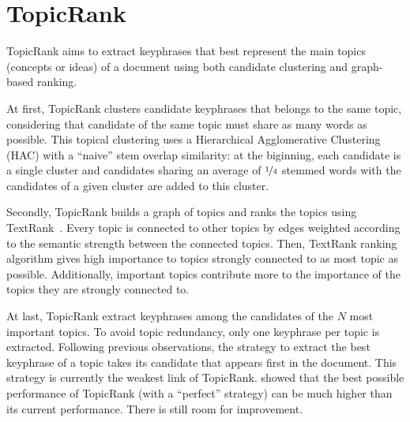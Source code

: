 \section{TopicRank}
\label{sec:topicrank}
  TopicRank aims to extract keyphrases that best represent the main topics
  (concepts or ideas) of a document using both candidate clustering and
  graph-based ranking.

  At first, TopicRank clusters candidate keyphrases that belongs to the same
  topic, considering that candidate of the same topic must share as many words
  as possible. This topical clustering uses a Hierarchical Agglomerative
  Clustering (HAC) with a ``naive'' stem overlap similarity: at the biginning,
  each candidate is a single cluster and candidates sharing an average of
  $\unitfrac{1}{4}$ stemmed words with the candidates of a given cluster are
  added to this cluster.

  Secondly, TopicRank builds a graph of topics and ranks the topics using
  TextRank~\cite{mihalcea2004textrank}. Every topic is connected to other topics
  by edges weighted according to the semantic strength between the connected
  topics. Then, TextRank ranking algorithm gives high importance to topics
  strongly connected to as most topic as possible. Additionally, important
  topics contribute more to the importance of the topics they are strongly
  connected to.

  At last, TopicRank extract keyphrases among the candidates of the $N$ most
  important topics. To avoid topic redundancy, only one keyphrase per topic is
  extracted. Following previous observations, the strategy to extract the best
  keyphrase of a topic takes its candidate that appears first in the document.
  This strategy is currently the weakest link of TopicRank.
   showed that the best possible performance of
  TopicRank (with a ``perfect'' strategy) can be much higher than its current
  performance. There is still room for improvement.


